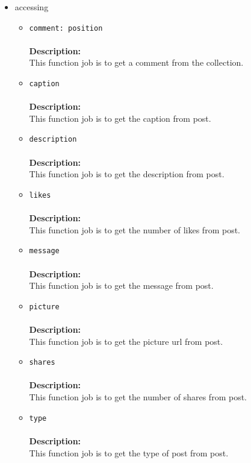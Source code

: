 \begin{itemize}
\begin{itemize}
\begin{itemize}
\item accessing
\label{sec-1-4-2-4-2-2}%
\begin{itemize}
\item \verb~comment: position~\\\\
\textbf{Description:}\\
      This function job is to get a comment from the collection.\\
\item \verb~caption~\\\\
\textbf{Description:}\\
      This function job is to get the caption from post.\\
\item \verb~description~\\\\
\textbf{Description:}\\
      This function job is to get the description from post.\\
\item \verb~likes~\\\\
\textbf{Description:}\\
      This function job is to get the number of likes from post.\\
\item \verb~message~\\\\
\textbf{Description:}\\
      This function job is to get the message from post.\\
\item \verb~picture~\\\\
\textbf{Description:}\\
      This function job is to get the picture url from post.\\
\item \verb~shares~\\\\
\textbf{Description:}\\
      This function job is to get the number of shares from post.\\
\item \verb~type~\\\\
\textbf{Description:}\\
      This function job is to get the type of post from post.
\end{itemize}


\end{itemize}
\end{itemize}
\end{itemize}
